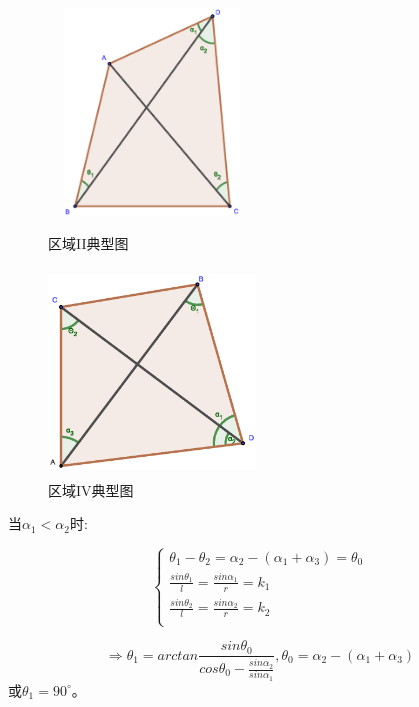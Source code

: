 \documentclass{ctexart}
\begin{document}
\begin{figure}[H]
  \begin{minipage}[t]{0.45\linewidth}
  \centering
  \includegraphics[height=5.5cm,width=5.5cm]{pic/case4.eps}
  \caption{区域II典型图}
  \label{区域II典型图}
  \end{minipage}%
  \begin{minipage}[t]{0.45\linewidth}
  \centering
  \includegraphics[height=5.5cm,width=5.5cm]{pic/case2+.eps}
  \caption{区域IV典型图}
  \label{区域IV典型图}
  \end{minipage}
  \end{figure}


当$\alpha_1 < \alpha_2$时:

\begin{equation}
    \left\{
              \begin{array}{ll}
                \theta_1-\theta_2=\alpha_2-(\alpha_1+\alpha_3)=\theta_0\\
                \frac{sin\theta_1}{l}=\frac{sin\alpha_1}{r}=k_1\\
                \frac{sin\theta_2}{l}=\frac{sin\alpha_2}{r}=k_2\\

              \end{array}
            \right.
\end{equation}

\[
    \Rightarrow \theta_1=arctan\frac{sin\theta_0}{cos\theta_0-\frac{sin\alpha_2}{sin\alpha_1}},\theta_0=\alpha_2-(\alpha_1+\alpha_3)
\]
或$\theta_1=90^{\circ}$。
\end{document}
